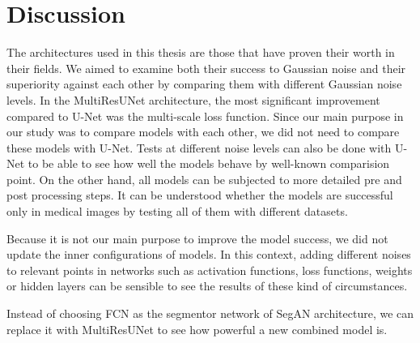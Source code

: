 \chapter{Discussion}

    The architectures used in this thesis are those that have proven their worth in their fields.
    We aimed to examine both their success to Gaussian noise and their superiority against each other by comparing them with different Gaussian noise levels.
    In the MultiResUNet architecture, the most significant improvement compared to U-Net was the multi-scale loss function.
    Since our main purpose in our study was to compare models with each other, we did not need to compare these models with U-Net.
    Tests at different noise levels can also be done with U-Net to be able to see how well the models behave by well-known comparision point.
    On the other hand, all models can be subjected to more detailed pre and post processing steps.
    It can be understood whether the models are successful only in medical images by testing all of them with different datasets.

    Because it is not our main purpose to improve the model success, we did not update the inner configurations of models.
    In this context, adding different noises to relevant points in networks such as activation functions,
    loss functions, weights or hidden layers can be sensible to see the results of these kind of circumstances.

    Instead of choosing FCN as the segmentor network of SegAN architecture, we can replace it with MultiResUNet to see how powerful a new combined model is.